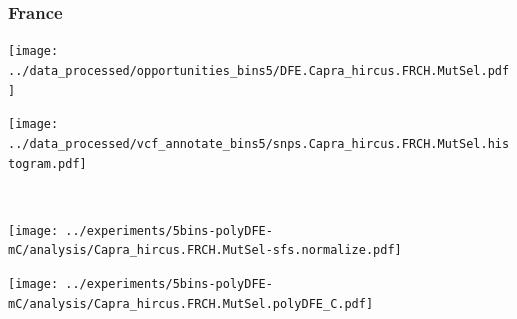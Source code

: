 \subsubsection{France}

\begin{minipage}{0.49\linewidth}
    \texttt{[image: ../data\_processed/opportunities\_bins5/DFE.Capra\_hircus.FRCH.MutSel.pdf]}
\end{minipage}
\begin{minipage}{0.49\linewidth}
    \texttt{[image: ../data\_processed/vcf\_annotate\_bins5/snps.Capra\_hircus.FRCH.MutSel.histogram.pdf]}
\end{minipage}
\\
\begin{minipage}{0.49\linewidth}
    \texttt{[image: ../experiments/5bins-polyDFE-mC/analysis/Capra\_hircus.FRCH.MutSel-sfs.normalize.pdf]}
\end{minipage}
\begin{minipage}{0.4\linewidth}
    \texttt{[image: ../experiments/5bins-polyDFE-mC/analysis/Capra\_hircus.FRCH.MutSel.polyDFE\_C.pdf]}
\end{minipage}
